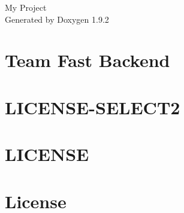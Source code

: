 \documentclass[twoside]{book}
\newcommand{\+}{\discretionary{\mbox{\scriptsize$\hookleftarrow$}}{}{}}
\newcommand{\clearemptydoublepage}{%
    \newpage{\pagestyle{empty}\cleardoublepage}%
  }
\begin{document}
  \raggedbottom
    \hypersetup{pageanchor=false,
                bookmarksnumbered=true,
                pdfencoding=unicode
               }
  \begin{titlepage}
  \vspace*{7cm}
  \begin{center}%
  {\Large My Project}\\
  \vspace*{1cm}
  {\large Generated by Doxygen 1.9.2}\\
  \end{center}
  \end{titlepage}
  \clearemptydoublepage
  \tableofcontents
  \clearemptydoublepage
  \hypersetup{pageanchor=true}
\chapter{Team Fast Backend}
\label{md__r_e_a_d_m_e}

\chapter{LICENSE-\/\+SELECT2}
\label{md_venv__lib_site_packages_django_contrib_admin_static_admin_css_vendor_select2__l_i_c_e_n_s_e__s_e_l_e_c_t2}

\chapter{LICENSE}
\label{md_venv__lib_site_packages_django_contrib_admin_static_admin_js_vendor_select2__l_i_c_e_n_s_e}

\chapter{License}
\label{md_venv__lib_site_packages_djangorestframework_3_12_4_dist_info__l_i_c_e_n_s_e}

\end{document}
